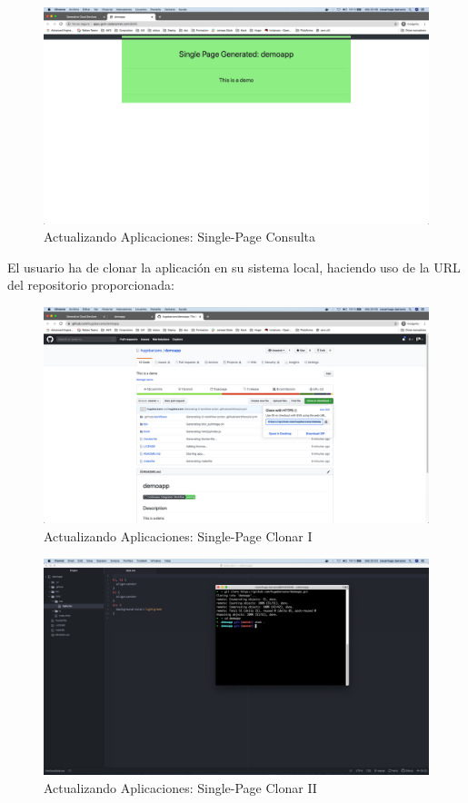 \documentclass[a4paper,11pt]{book}
\begin{document}
\begin{figure}[H]
\centering
\includegraphics[scale=0.2]{imagenes/casouso/2_2.png}
\caption{  Actualizando Aplicaciones: Single-Page Consulta }
\end{figure}

 El usuario ha de clonar la aplicación en su sistema local, haciendo uso de la URL del repositorio proporcionada:
 
 \begin{figure}[H]
\centering
\includegraphics[scale=0.2]{imagenes/casouso/2_3.png}
\caption{  Actualizando Aplicaciones: Single-Page Clonar I }
\end{figure}


\begin{figure}[H]
\centering
\includegraphics[scale=0.2]{imagenes/casouso/2_4.png}
\caption{  Actualizando Aplicaciones: Single-Page Clonar II }
\end{figure}
\end{document}
